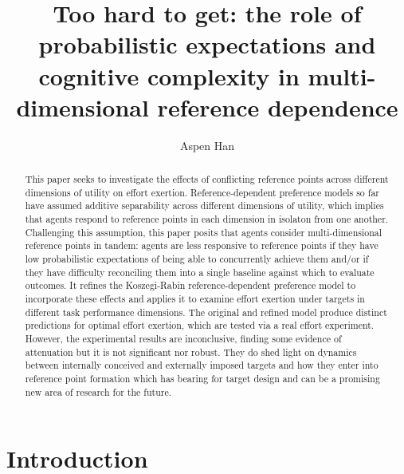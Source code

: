 \documentclass[
  12,
  letterpaper,
  DIV=11,
  numbers=noendperiod]{scrartcl}
\title{Too hard to get: the role of probabilistic expectations and
cognitive complexity in multi-dimensional reference dependence}
\author{Aspen Han}
\date{}
\begin{document}
\maketitle
\begin{abstract}
This paper seeks to investigate the effects of conflicting reference
points across different dimensions of utility on effort exertion.
Reference-dependent preference models so far have assumed additive
separability across different dimensions of utility, which implies that
agents respond to reference points in each dimension in isolaton from
one another. Challenging this assumption, this paper posits that agents
consider multi-dimensional reference points in tandem: agents are less
responsive to reference points if they have low probabilistic
expectations of being able to concurrently achieve them and/or if they
have difficulty reconciling them into a single baseline against which to
evaluate outcomes. It refines the Koszegi-Rabin reference-dependent
preference model to incorporate these effects and applies it to examine
effort exertion under targets in different task performance dimensions.
The original and refined model produce distinct predictions for optimal
effort exertion, which are tested via a real effort experiment. However,
the experimental results are inconclusive, finding some evidence of
attenuation but it is not significant nor robust. They do shed light on
dynamics between internally conceived and externally imposed targets and
how they enter into reference point formation which has bearing for
target design and can be a promising new area of research for the
future.
\end{abstract}


\section{Introduction}\label{introduction}
\end{document}
